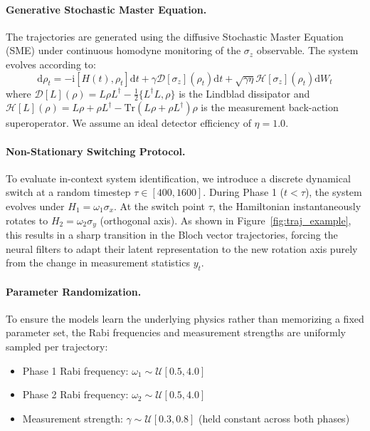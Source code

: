 \documentclass{article} %
\begin{document}
\paragraph{Generative Stochastic Master Equation.}
The trajectories are generated using the diffusive Stochastic Master Equation (SME) under continuous homodyne monitoring of the $\sigma_z$ observable. The system evolves according to:
\begin{equation}
\mathrm{d}\rho_t = -\mathrm{i}[H(t), \rho_t]\mathrm{d}t + \gamma \mathcal{D}[\sigma_z](\rho_t) \mathrm{d}t + \sqrt{\gamma \eta} \mathcal{H}[\sigma_z](\rho_t) \mathrm{d}W_t
\end{equation}
where $\mathcal{D}[L](\rho) = L\rho L^\dagger - \frac{1}{2}\{L^\dagger L, \rho\}$ is the Lindblad dissipator and $\mathcal{H}[L](\rho) = L\rho + \rho L^\dagger - \text{Tr}(L\rho + \rho L^\dagger)\rho$ is the measurement back-action superoperator. We assume an ideal detector efficiency of $\eta = 1.0$.

\paragraph{Non-Stationary Switching Protocol.}
To evaluate in-context system identification, we introduce a discrete dynamical switch at a random timestep $\tau \in [400, 1600]$. During Phase 1 ($t < \tau$), the system evolves under $H_1 = \omega_1 \sigma_x$. At the switch point $\tau$, the Hamiltonian instantaneously rotates to $H_2 = \omega_2 \sigma_y$ (orthogonal axis). As shown in Figure~\ref{fig:traj_example}, this results in a sharp transition in the Bloch vector trajectories, forcing the neural filters to adapt their latent representation to the new rotation axis purely from the change in measurement statistics $y_t$.

\paragraph{Parameter Randomization.}
To ensure the models learn the underlying physics rather than memorizing a fixed parameter set, the Rabi frequencies and measurement strengths are uniformly sampled per trajectory:
\begin{itemize}
    \item Phase 1 Rabi frequency: $\omega_1 \sim \mathcal{U}[0.5, 4.0]$
    \item Phase 2 Rabi frequency: $\omega_2 \sim \mathcal{U}[0.5, 4.0]$
    \item Measurement strength: $\gamma \sim \mathcal{U}[0.3, 0.8]$ (held constant across both phases)
\end{itemize}
\end{document}
